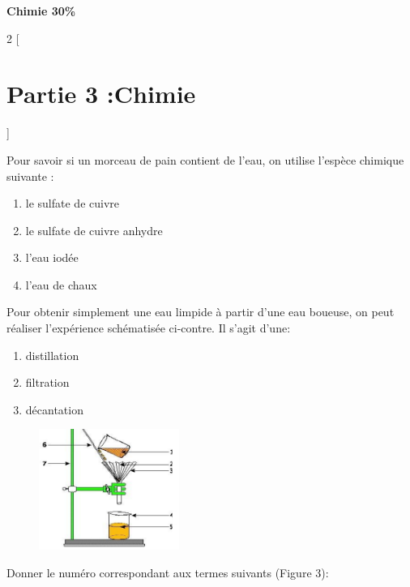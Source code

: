 \documentclass[12pt]{article}
\begin{document}
\begin{center}

\vspace{4cm}
\hrulefill
\textbf{Chimie 30\%}
\hrulefill


\end{center}
\begin{multicols}{2}
    [
        \section*{Partie 3 :Chimie}
    ]
	\begin{enumerate}
		\item Pour savoir si un morceau de pain contient de l’eau, on utilise l’espèce
chimique suivante :
\begin{enumerate}
	\item le sulfate de cuivre
	\item le sulfate de cuivre anhydre
	\item l’eau iodée
	\item l’eau de chaux
\end{enumerate}
\item Pour obtenir simplement une eau limpide à partir d’une eau boueuse, on
peut réaliser l’expérience schématisée ci-contre. Il s’agit
d’une:
\begin{enumerate}
	\item distillation
	\item filtration
	\item décantation
\end{enumerate}

\begin{minipage}{\linewidth} 
\begin{figure} 
\vspace{-12pt} 
\includegraphics[width=1.8in]{./img/filtration.png}
\vspace{-1cm}
\caption{}
\end{figure} 

\item Donner le numéro correspondant aux termes suivants (Figure 3):


\end{minipage}
\end{enumerate}
\end{multicols}
\end{document}
